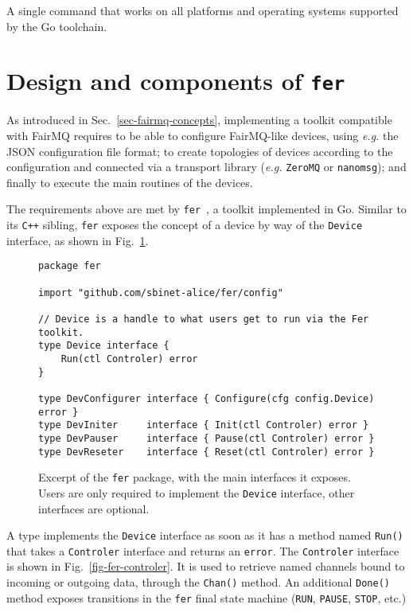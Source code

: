 \documentclass{webofc}
\begin{document}
A single command that works on all platforms and operating systems supported by the Go toolchain.

\section{Design and components of \texttt{fer}}
\label{sec-fer}

As introduced in Sec.~\ref{sec-fairmq-concepts}, implementing a toolkit compatible with FairMQ requires to be able to configure FairMQ-like devices, using \emph{e.g.} the JSON configuration file format; to create topologies of devices according to the configuration and connected via a transport library (\emph{e.g.} \texttt{ZeroMQ} or \texttt{nanomsg}); and finally to execute the main routines of the devices.

The requirements above are met by \texttt{fer}~\cite{ref-fer}, a toolkit implemented in Go.
Similar to its \texttt{C++} sibling, \texttt{fer} exposes the concept of a device by way of the \texttt{Device} interface, as shown in Fig.~\ref{fig-fer-device}.

\begin{figure}[h]
\centering
\begin{verbatim}
package fer

import "github.com/sbinet-alice/fer/config"

// Device is a handle to what users get to run via the Fer toolkit.
type Device interface {
	Run(ctl Controler) error
}

type DevConfigurer interface { Configure(cfg config.Device) error }
type DevIniter     interface { Init(ctl Controler) error }
type DevPauser     interface { Pause(ctl Controler) error }
type DevReseter    interface { Reset(ctl Controler) error }
\end{verbatim}
	\caption{Excerpt of the \texttt{fer} package, with the main interfaces it exposes. Users are only required to implement the \texttt{Device} interface, other interfaces are optional.}
\label{fig-fer-device}
\end{figure}

A type implements the \texttt{Device} interface as soon as it has a method named \texttt{Run()} that takes a \texttt{Controler} interface and returns an \texttt{error}.
The \texttt{Controler} interface is shown in Fig.~\ref{fig-fer-controler}.
It is used to retrieve named channels bound to incoming or outgoing data, through the \texttt{Chan()} method.
An additional \texttt{Done()} method exposes transitions in the \texttt{fer} final state machine (\texttt{RUN}, \texttt{PAUSE}, \texttt{STOP}, etc.)
\end{document}
